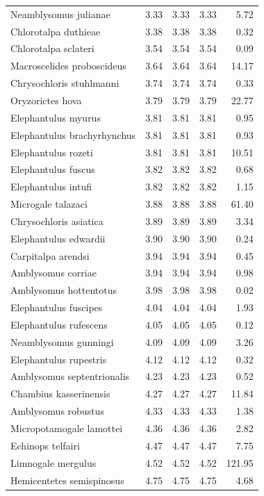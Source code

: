 \documentclass[]{elsarticle} %
\begin{document}
\begin{longtable}[t]{lrrrr}
Neamblysomus julianae & 3.33 & 3.33 & 3.33 & 5.72\\
Chlorotalpa duthieae & 3.38 & 3.38 & 3.38 & 0.32\\
Chlorotalpa sclateri & 3.54 & 3.54 & 3.54 & 0.09\\
Macroscelides proboscideus & 3.64 & 3.64 & 3.64 & 14.17\\
Chrysochloris stuhlmanni & 3.74 & 3.74 & 3.74 & 0.33\\
\addlinespace
Oryzorictes hova & 3.79 & 3.79 & 3.79 & 22.77\\
Elephantulus myurus & 3.81 & 3.81 & 3.81 & 0.95\\
Elephantulus brachyrhynchus & 3.81 & 3.81 & 3.81 & 0.93\\
Elephantulus rozeti & 3.81 & 3.81 & 3.81 & 10.51\\
Elephantulus fuscus & 3.82 & 3.82 & 3.82 & 0.68\\
\addlinespace
Elephantulus intufi & 3.82 & 3.82 & 3.82 & 1.15\\
Microgale talazaci & 3.88 & 3.88 & 3.88 & 61.40\\
Chrysochloris asiatica & 3.89 & 3.89 & 3.89 & 3.34\\
Elephantulus edwardii & 3.90 & 3.90 & 3.90 & 0.24\\
Carpitalpa arendsi & 3.94 & 3.94 & 3.94 & 0.45\\
\addlinespace
Amblysomus corriae & 3.94 & 3.94 & 3.94 & 0.98\\
Amblysomus hottentotus & 3.98 & 3.98 & 3.98 & 0.02\\
Elephantulus fuscipes & 4.04 & 4.04 & 4.04 & 1.93\\
Elephantulus rufescens & 4.05 & 4.05 & 4.05 & 0.12\\
Neamblysomus gunningi & 4.09 & 4.09 & 4.09 & 3.26\\
\addlinespace
Elephantulus rupestris & 4.12 & 4.12 & 4.12 & 0.32\\
Amblysomus septentrionalis & 4.23 & 4.23 & 4.23 & 0.52\\
Chambius kasserinensis & 4.27 & 4.27 & 4.27 & 11.84\\
Amblysomus robustus & 4.33 & 4.33 & 4.33 & 1.38\\
Micropotamogale lamottei & 4.36 & 4.36 & 4.36 & 2.82\\
\addlinespace
Echinops telfairi & 4.47 & 4.47 & 4.47 & 7.75\\
Limnogale mergulus & 4.52 & 4.52 & 4.52 & 121.95\\
Hemicentetes semispinosus & 4.75 & 4.75 & 4.75 & 4.68\\

\end{longtable}
\end{document}
